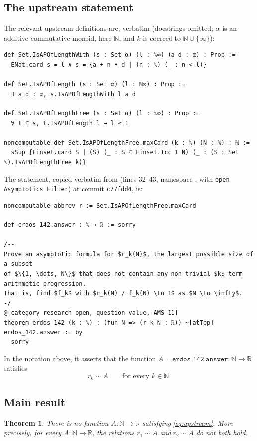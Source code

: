 \documentclass[11pt]{amsart}
\theoremstyle{plain}
\newtheorem{theorem}{Theorem}
\theoremstyle{definition}
\newcommand{\N}{\mathbb{N}}
\newcommand{\R}{\mathbb{R}}
\newcommand{\Ninf}{\N\cup\{\infty\}}
\begin{document}
\subsection{The upstream statement}
The relevant upstream definitions are, verbatim (docstrings omitted; $\alpha$ is an additive commutative monoid, here $\N$, and $k$ is coerced to $\Ninf$):
\begin{lstlisting}
def Set.IsAPOfLengthWith (s : Set α) (l : ℕ∞) (a d : α) : Prop :=
  ENat.card s = l ∧ s = {a + n • d | (n : ℕ) (_ : n < l)}

def Set.IsAPOfLength (s : Set α) (l : ℕ∞) : Prop :=
  ∃ a d : α, s.IsAPOfLengthWith l a d

def Set.IsAPOfLengthFree (s : Set α) (l : ℕ∞) : Prop :=
  ∀ t ⊆ s, t.IsAPOfLength l → l ≤ 1

noncomputable def Set.IsAPOfLengthFree.maxCard (k : ℕ) (N : ℕ) : ℕ :=
  sSup {Finset.card S | (S) (_ : S ⊆ Finset.Icc 1 N) (_ : (S : Set ℕ).IsAPOfLengthFree k)}
\end{lstlisting}
The statement, copied verbatim from  (lines 32--43, namespace , with \texttt{open Asymptotics Filter}) at commit \texttt{c77fdd4}, is:
\begin{lstlisting}
noncomputable abbrev r := Set.IsAPOfLengthFree.maxCard

def erdos_142.answer : ℕ → ℝ := sorry

/--
Prove an asymptotic formula for $r_k(N)$, the largest possible size of a subset
of $\{1, \dots, N\}$ that does not contain any non-trivial $k$-term arithmetic progression.
That is, find $f_k$ with $r_k(N) / f_k(N) \to 1$ as $N \to \infty$.
-/
@[category research open, question value, AMS 11]
theorem erdos_142 (k : ℕ) : (fun N => (r k N : ℝ)) ~[atTop] erdos_142.answer := by
  sorry
\end{lstlisting}
In the notation above, it asserts that the function $A=\texttt{erdos\_142.answer}\colon\N\to\R$ satisfies
\begin{equation}\label{eq:upstream}
r_k\sim A\qquad\text{for every } k\in\N .
\end{equation}

\subsection{Main result}

\begin{theorem}\label{thm:main}
There is no function $A\colon\N\to\R$ satisfying \eqref{eq:upstream}. More precisely, for every $A\colon\N\to\R$, the relations $r_1\sim A$ and $r_2\sim A$ do not both hold.
\end{theorem}
\end{document}
